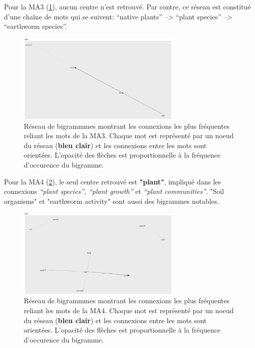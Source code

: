 \documentclass{book}
\begin{document}
\newpage
Pour la MA3 (\cref{network3}), aucun centre n'est retrouvé. Par contre, ce réseau est constitué d'une chaîne de mots qui se suivent: “native plants” –> “plant species” –> “earthworm species”.

\begin{figure}[htb] %
    \begin{center} %
        \includegraphics[width=0.7\textwidth]{network3.png}
        \caption[Réseau de bigrammmes orienté montrant les connexions les plus fréquentes reliant les mots de la MA3.]{Réseau de bigrammmes montrant les connexions les plus fréquentes reliant les mots de la MA3. Chaque mot est représenté par un noeud du réseau (\textbf{bleu clair}) et les connexions entre les mots sont orientées. L'opacité des flèches est proportionnelle à la fréquence d'occurence du bigramme.\label{network3}}
    \end{center}  
\end{figure}

Pour la MA4 (\cref{network4}), le seul centre retrouvé est \textbf{"plant"}, impliqué dans les connexions \textit{“plant species”, “plant growth”} et \textit{ “plant communities”}. "Soil organisms" et "earthworm activity" sont aussi des bigrammes notables.

\begin{figure}[htb] %
    \begin{center} %
        \includegraphics[width=0.7\textwidth]{network4.png}
        \caption[Réseau de bigrammmes orienté montrant les connexions les plus fréquentes reliant les mots de la MA4.]{Réseau de bigrammmes montrant les connexions les plus fréquentes reliant les mots de la MA4. Chaque mot est représenté par un noeud du réseau (\textbf{bleu clair}) et les connexions entre les mots sont orientées. L'opacité des flèches est proportionnelle à la fréquence d'occurence du bigramme.\label{network4}}
    \end{center}  
\end{figure}
\end{document}
